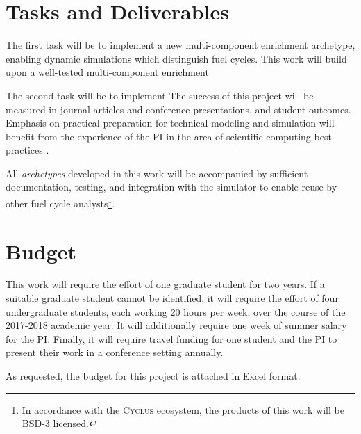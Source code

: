 \documentclass[letterpaper]{article}
\newcommand{\Cyclus}{\textsc{Cyclus}\xspace}%
\begin{document}
\section{Tasks and Deliverables}

The first task will be to implement a new multi-component enrichment archetype, 
enabling dynamic simulations which distinguish fuel cycles. This work will build upon a well-tested multi-component enrichment  

The second task will be to implement
The success of this project will be measured in journal articles and conference 
presentations, and student outcomes. Emphasis on practical preparation for 
technical modeling and simulation will benefit from the experience of the 
\gls{PI} in the area of scientific computing best practices 
\cite{scopatz_effective_2015,wilson_best_2014,huff_lessons_2017,huff_case_2017}.

All \emph{archetypes} developed in this work will be accompanied by sufficient documentation, testing, and integration with the simulator to enable reuse by other fuel cycle analysts\footnote{In accordance with the \Cyclus ecosystem, the products of this work will be BSD-3 licensed.}.
\section{Budget}
This work will require the effort of one graduate student for two years. If a 
suitable graduate student cannot be identified, it will require the effort of 
four undergraduate students, each working 20 hours per week, over the course of 
the 2017-2018 academic year. It will additionally require one week of summer 
salary for the PI. Finally, it will require travel funding for one 
student and the PI to present their work in a conference setting annually. 

As requested, the budget for this project is attached in Excel format.



\end{document}

